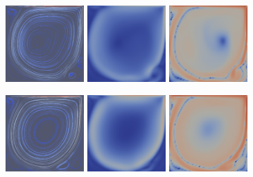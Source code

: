 \documentclass[english, nochinese]{pkupaper}
\begin{document}
\begin{figure}[htbp]
{
\centering
{
\includegraphics[width=3cm]{Results/Figure01b.pdf}
\includegraphics[width=3cm]{Results/Figure01a.pdf}
\includegraphics[width=3cm]{Results/Figure02e.pdf}
}

{
\includegraphics[width=3cm]{Results/Figure01e.pdf}
\includegraphics[width=3cm]{Results/Figure01d.pdf}
\includegraphics[width=3cm]{Results/Figure02j.pdf}
}

}
\end{figure}
\end{document}

